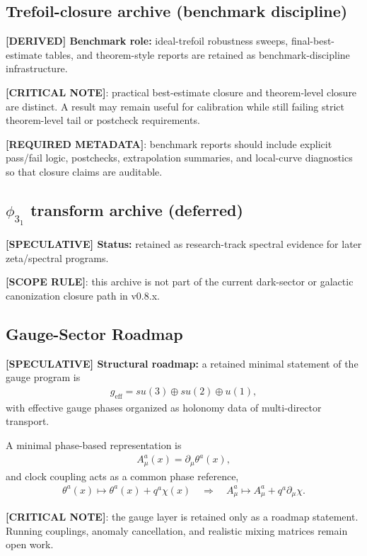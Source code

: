 \subsection{Trefoil-closure archive (benchmark discipline)}
\textbf{[DERIVED] Benchmark role:} ideal-trefoil robustness sweeps, final-best-estimate tables, and theorem-style reports are retained as benchmark-discipline infrastructure.

\textbf{[CRITICAL NOTE]}: practical best-estimate closure and theorem-level closure are distinct.
A result may remain useful for calibration while still failing strict theorem-level tail or postcheck requirements.

\textbf{[REQUIRED METADATA]}: benchmark reports should include explicit pass/fail logic, postchecks, extrapolation summaries, and local-curve diagnostics so that closure claims are auditable.

\subsection{\texorpdfstring{$\phi_{3_1}$}{phi3_1} transform archive (deferred)}
\textbf{[SPECULATIVE] Status:} retained as research-track spectral evidence for later zeta/spectral programs.

\textbf{[SCOPE RULE]}: this archive is not part of the current dark-sector or galactic canonization closure path in v0.8.x.

\subsection{Gauge-Sector Roadmap}
\textbf{[SPECULATIVE] Structural roadmap:} a retained minimal statement of the gauge program is
\begin{align}
    g_{\mathrm{eff}} = su(3) \oplus su(2) \oplus u(1),
\end{align}
with effective gauge phases organized as holonomy data of multi-director transport.

A minimal phase-based representation is
\begin{align}
    A^a_{\mu}(x) = \partial_{\mu}\theta^a(x),
\end{align}
and clock coupling acts as a common phase reference,
\begin{align}
    \theta^a(x) \mapsto \theta^a(x)+q^a\chi(x)
    \quad\Rightarrow\quad
    A^a_{\mu}\mapsto A^a_{\mu}+q^a\partial_{\mu}\chi.
\end{align}

\textbf{[CRITICAL NOTE]}: the gauge layer is retained only as a roadmap statement. Running couplings, anomaly cancellation, and realistic mixing matrices remain open work.

